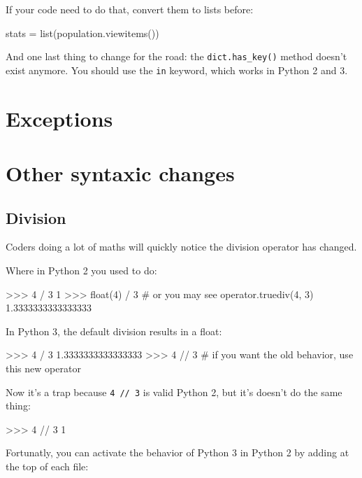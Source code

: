 If your code need to do that, convert them to lists before:

\begin{py3}
stats = list(population.viewitems())
\end{py3}

And one last thing to change for the road: the \lstinline{dict.has_key()} method doesn't exist anymore. You should use the \lstinline{in} \gls{keyword}, which works in Python 2 and 3.

\section{Exceptions}

















\section{Other syntaxic changes}

\subsection{Division}

Coders doing a lot of maths will quickly notice the division operator has changed.

Where in Python 2 you used to do:

\begin{py2}
>>> 4 / 3
1
>>> float(4) / 3  # or you may see operator.truediv(4, 3)
1.3333333333333333
\end{py2}

In Python 3, the default division results in a float:

\begin{py3}
>>> 4 / 3
1.3333333333333333
>>> 4 // 3  # if you want the old behavior, use this new operator
\end{py3}

Now it's a trap because \lstinline{4 // 3} is valid Python 2, but it's doesn't do the same thing:

\begin{py2}
>>> 4 // 3
1
\end{py2}

Fortunatly, you can activate the behavior of Python 3 in Python 2 by adding at the top of each file:

